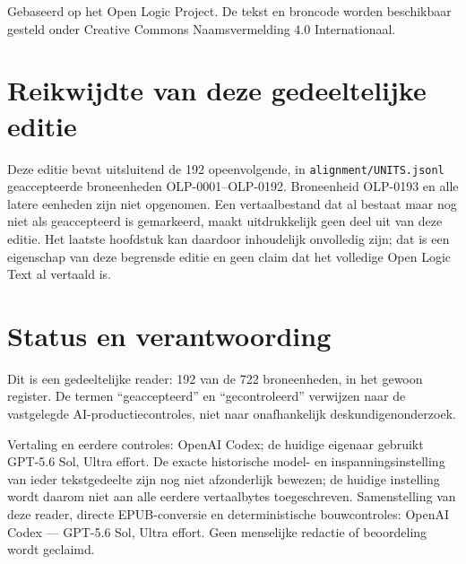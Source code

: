 \documentclass[openany]{memoir}
\begin{document}
\begin{titlingpage}
\vfill
\noindent Gebaseerd op het Open Logic Project. De tekst en broncode worden
beschikbaar gesteld onder Creative Commons Naamsvermelding 4.0 Internationaal.
\end{titlingpage}
\chapter*{Reikwijdte van deze gedeeltelijke editie}
Deze editie bevat uitsluitend de 192 opeenvolgende,
in \texttt{alignment/UNITS.jsonl} geaccepteerde broneenheden OLP-0001--OLP-0192.
Broneenheid OLP-0193 en alle latere eenheden zijn niet opgenomen.
Een vertaalbestand dat al bestaat maar nog niet als geaccepteerd is gemarkeerd,
maakt uitdrukkelijk geen deel uit van deze editie. Het laatste hoofdstuk kan
daardoor inhoudelijk onvolledig zijn; dat is een eigenschap van deze begrensde
editie en geen claim dat het volledige Open Logic Text al vertaald is.
\chapter*{Status en verantwoording}
Dit is een gedeeltelijke reader: 192 van de 722
broneenheden, in het gewoon register. De termen
``geaccepteerd'' en ``gecontroleerd'' verwijzen naar de vastgelegde
AI-productiecontroles, niet naar onafhankelijk deskundigenonderzoek.

Vertaling en eerdere controles: OpenAI Codex; de huidige eigenaar gebruikt GPT-5.6 Sol, Ultra effort. De exacte historische model- en inspanningsinstelling van ieder tekstgedeelte zijn nog niet afzonderlijk bewezen; de huidige instelling wordt daarom niet aan alle eerdere vertaalbytes toegeschreven. Samenstelling van deze reader, directe EPUB-conversie en deterministische bouwcontroles: OpenAI Codex — GPT-5.6 Sol, Ultra effort. Geen menselijke redactie of beoordeling wordt geclaimd.
\tableofcontents*

\begingroup
\def\olfilename{OLP-0001}
\def\olfilepath{content/}
\hypertarget{unit-OLP-0001}{}
\end{document}
